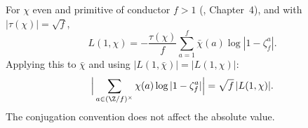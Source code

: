 For $\chi$ even and primitive of conductor $f>1$ (\cite{Wash}, Chapter~4), and with $|\tau(\chi)|=\sqrt f$,
\[ L(1,\chi)=-\frac{\tau(\chi)}{f}\sum_{a=1}^f\bar\chi(a)\log|1-\zeta_f^a| . \]
Applying this to $\bar\chi$ and using $|L(1,\bar\chi)|=|L(1,\chi)|$:
\[ \Big|\sum_{a\in(\Z/f)^\times}\chi(a)\log|1-\zeta_f^a|\Big|=\sqrt f\,|L(1,\chi)| . \] The conjugation convention does not affect the absolute value.
